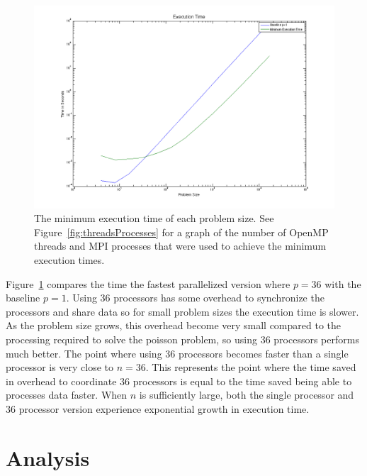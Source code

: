 \documentclass{article}
\begin{document}
	\begin{figure}[htbp]
	\begin{center}
	\includegraphics[width=15cm,keepaspectratio=true]{figs/executionTime}
	\caption{The minimum execution time of each problem size. See Figure~\ref{fig:threadsProcesses} for a graph of the number of OpenMP threads and MPI processes that were used to achieve the minimum execution times.}
	\label{fig:executionTime}
	\end{center}
	\end{figure}

	Figure~\ref{fig:executionTime} compares the time the fastest parallelized version where $p=36$ with the baseline $p=1$. Using 36 processors has some overhead to synchronize the processors and share data so for small problem sizes the execution time is slower. As the problem size grows, this overhead become very small compared to the processing required to solve the poisson problem, so using 36 processors performs much better. The point where using 36 processors becomes faster than a single processor is very close to $n=36$. This represents the point where the time saved in overhead to coordinate 36 processors is equal to the time saved being able to processes data faster. When $n$ is sufficiently large, both the single processor and 36 processor version experience exponential growth in execution time.  
	

\section{Analysis}
\end{document}
